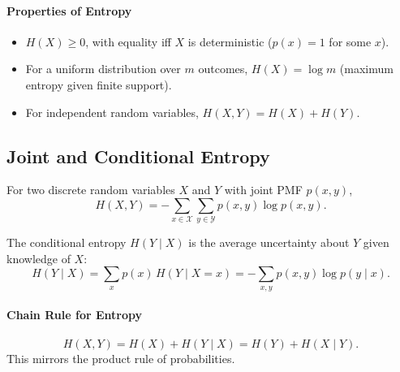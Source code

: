 \documentclass{tufte-handout}
\begin{document}
\begin{marginfigure}
\centering
{}
\caption{Binary entropy $H(p) = -p\log_2 p - (1-p)\log_2(1-p)$. Maximum uncertainty at $p=0.5$.}
\end{marginfigure}

\paragraph{Properties of Entropy}
\begin{itemize}
    \item $H(X) \ge 0$, with equality iff $X$ is deterministic ($p(x)=1$ for some $x$).
    \item For a uniform distribution over $m$ outcomes, $H(X) = \log m$ (maximum entropy given finite support).
    \item For independent random variables, $H(X,Y) = H(X) + H(Y)$.
\end{itemize}

\subsection{Joint and Conditional Entropy}

\begin{defn}
    For two discrete random variables $X$ and $Y$ with joint PMF $p(x,y)$,
    \[
    H(X,Y) = -\sum_{x \in \mathcal{X}} \sum_{y \in \mathcal{Y}} p(x,y) \log p(x,y).
    \]
\end{defn}

\begin{defn}
    The conditional entropy $H(Y \mid X)$ is the average uncertainty about $Y$ given knowledge of $X$:
    \[
    H(Y \mid X) = \sum_{x} p(x) \, H(Y \mid X=x) = -\sum_{x,y} p(x,y) \log p(y \mid x).
    \]
\end{defn}

\paragraph{Chain Rule for Entropy}
\[
H(X,Y) = H(X) + H(Y \mid X) = H(Y) + H(X \mid Y).
\]
This mirrors the product rule of probabilities.
\end{document}
